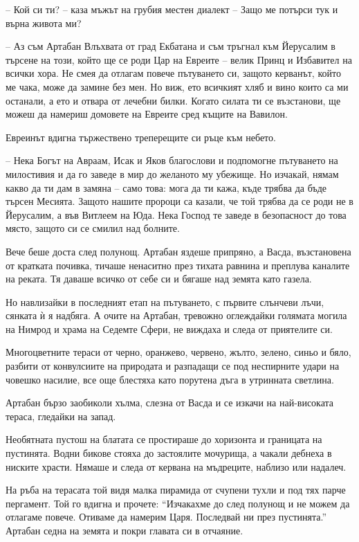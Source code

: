 -- Кой си ти? -- каза мъжът на грубия местен диалект -- Защо ме потърси тук и
върна живота ми?

-- Аз съм Артабан Влъхвата от град Екбатана и съм тръгнал към Йерусалим в
търсене на този, който ще се роди Цар на Евреите -- велик Принц и Избавител на
всички хора. Не смея да отлагам повече пътуването си, защото керванът, който ме
чака, може да замине без мен. Но виж, ето всичкият хляб и вино които са ми
останали, а ето и отвара от лечебни билки. Когато силата ти се възстанови, ще
можеш да намериш домовете на Евреите сред къщите на Вавилон.

Евреинът вдигна тържествено треперещите си ръце към небето.

-- Нека Богът на Авраам, Исак и Яков благослови и подпомогне пътуването на
милостивия и да го заведе в мир до желаното му убежище. Но изчакай, нямам какво
да ти дам в замяна -- само това: мога да ти кажа, къде трябва да бъде търсен
Месията. Защото нашите пророци са казали, че той трябва да се роди не в
Йерусалим, а във Витлеем на Юда. Нека Господ те заведе в безопасност до това
място, защото си се смилил над болните.

Вече беше доста след полунощ. Артабан яздеше припряно, а Васда, възстановена от
кратката почивка, тичаше ненаситно през тихата равнина и преплува каналите на
реката. Тя даваше всичко от себе си и бягаше над земята като газела.

Но навлизайки в последният етап на пътуването, с първите слънчеви лъчи, сянката
ѝ я надбяга. А очите на Артабан, тревожно оглеждайки голямата могила на Нимрод и
храма на Седемте Сфери, не виждаха и следа от приятелите си.

Многоцветните тераси от черно, оранжево, червено, жълто, зелено, синьо и бяло,
разбити от конвулсиите на природата и разпадащи се под неспирните удари на
човешко насилие, все още блестяха като порутена дъга в утринната светлина.

Артабан бързо заобиколи хълма, слезна от Васда и се изкачи на най-високата
тераса, гледайки на запад.

Необятната пустош на блатата се простираше до хоризонта и границата на
пустинята. Водни бикове стояха до застоялите мочурища, а чакали дебнеха в
ниските храсти. Нямаше и следа от кервана на мъдреците, наблизо или надалеч.

На ръба на терасата той видя малка пирамида от счупени тухли и под тях парче
пергамент. Той го вдигна и прочете: ``Изчакахме до след полунощ и не можем да
отлагаме повече. Отиваме да намерим Царя. Последвай ни през пустинята.'' Артабан
седна на земята и покри главата си в отчаяние.

